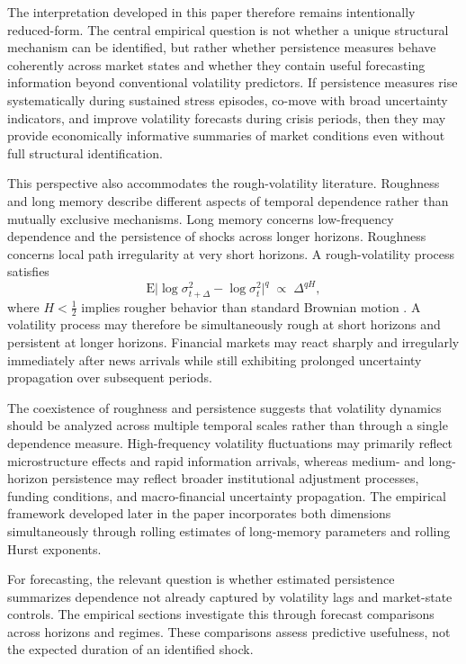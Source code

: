 \documentclass[jrfm,article,submit,moreauthors,pdftex]{Definitions/mdpi}
\begin{document}
The interpretation developed in this paper therefore remains intentionally
reduced-form. The central empirical question is not whether a unique
structural mechanism can be identified, but rather whether persistence
measures behave coherently across market states and whether they contain
useful forecasting information beyond conventional volatility predictors.
If persistence measures rise systematically during sustained stress
episodes, co-move with broad uncertainty indicators, and improve volatility
forecasts during crisis periods, then they may provide economically
informative summaries of market conditions even without full structural
identification.

This perspective also accommodates the rough-volatility literature.
Roughness and long memory describe different aspects of temporal dependence
rather than mutually exclusive mechanisms. Long memory concerns
low-frequency dependence and the persistence of shocks across longer
horizons. Roughness concerns local path irregularity at very short horizons.
A rough-volatility process satisfies
\begin{equation}
  \mathrm{E}\bigl|\log\sigma^2_{t+\Delta} - \log\sigma^2_t\bigr|^q
  \;\propto\; \Delta^{qH},
  \label{eq:rough-scaling-sec3}
\end{equation}
where $H<\frac{1}{2}$ implies rougher behavior than standard Brownian motion
\citep{gatheral2018volatility}. A volatility process may therefore be
simultaneously rough at short horizons and persistent at longer horizons.
Financial markets may react sharply and irregularly immediately after news
arrivals while still exhibiting prolonged uncertainty propagation over
subsequent periods.

The coexistence of roughness and persistence suggests that volatility
dynamics should be analyzed across multiple temporal scales rather than
through a single dependence measure. High-frequency volatility fluctuations
may primarily reflect microstructure effects and rapid information arrivals,
whereas medium- and long-horizon persistence may reflect broader
institutional adjustment processes, funding conditions, and macro-financial
uncertainty propagation. The empirical framework developed later in the
paper incorporates both dimensions simultaneously through rolling estimates
of long-memory parameters and rolling Hurst exponents.

For forecasting, the relevant question is whether estimated persistence
summarizes dependence not already captured by volatility lags and
market-state controls. The empirical sections investigate this through
forecast comparisons across horizons and regimes. These comparisons assess
predictive usefulness, not the expected duration of an identified shock.
\end{document}
